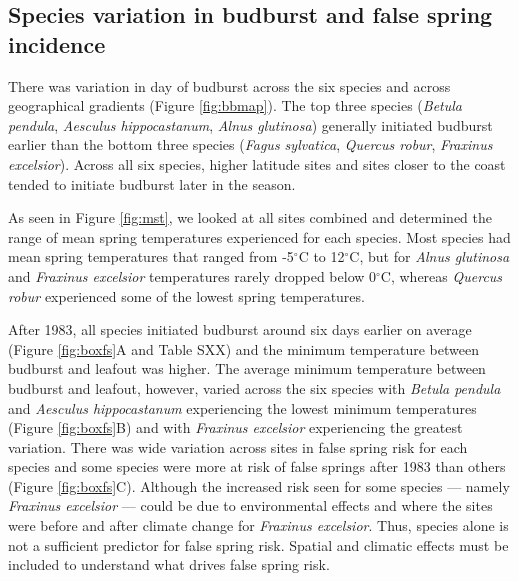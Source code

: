 \documentclass{article}\usepackage[]{graphicx}\usepackage[]{color}
\begin{document}
\subsection*{Species variation in budburst and false spring incidence}
There was variation in day of budburst across the six species and across geographical gradients (Figure \ref{fig:bbmap}). The top three species (\textit{Betula pendula}, \textit{Aesculus hippocastanum}, \textit{Alnus glutinosa}) generally initiated budburst earlier than the bottom three species (\textit{Fagus sylvatica}, \textit{Quercus robur}, \textit{Fraxinus excelsior}). Across all six species, higher latitude sites and sites closer to the coast tended to initiate budburst later in the season. 

As seen in Figure \ref{fig:mst}, we looked at all sites combined and determined the range of mean spring temperatures experienced for each species. Most species had mean spring temperatures that ranged from -5$^{\circ}$C to 12$^{\circ}$C, but for \textit{Alnus glutinosa} and \textit{Fraxinus excelsior} temperatures rarely dropped below 0$^{\circ}$C, whereas \textit{Quercus robur} experienced some of the lowest spring temperatures. 

After 1983, all species initiated budburst around six days earlier on average (Figure \ref{fig:boxfs}A and Table SXX) and the minimum temperature between budburst and leafout was higher.  The average minimum temperature between budburst and leafout, however, varied across the six species with \textit{Betula pendula} and \textit{Aesculus hippocastanum} experiencing the lowest minimum temperatures (Figure \ref{fig:boxfs}B) and with \textit{Fraxinus excelsior} experiencing the greatest variation. There was wide variation across sites in false spring risk for each species and some species were more at risk of false springs after 1983 than others (Figure \ref{fig:boxfs}C). Although the increased risk seen for some species --- namely \textit{Fraxinus excelsior} --- could be due to environmental effects and where the sites were before and after climate change for \textit{Fraxinus excelsior}. Thus, species alone is not a sufficient predictor for false spring risk. Spatial and climatic effects must be included to understand what drives false spring risk. 
\end{document}
